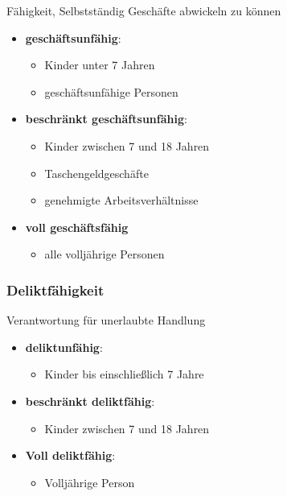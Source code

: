 Fähigkeit, Selbstständig Geschäfte abwickeln zu können

\begin{itemize}
	\item \textbf{geschäftsunfähig}: 
	\begin{itemize}
		\item Kinder unter 7 Jahren 
		\item geschäftsunfähige Personen
	\end{itemize}
	\item \textbf{beschränkt geschäftsunfähig}:
	\begin{itemize}
		\item Kinder zwischen 7 und 18 Jahren
		\item Taschengeldgeschäfte
		\item genehmigte Arbeitsverhältnisse
	\end{itemize}
	\item\textbf{voll geschäftsfähig}
	\begin{itemize}
		\item alle volljährige Personen
	\end{itemize}
\end{itemize}
    
\subsubsection{Deliktfähigkeit}

Verantwortung für unerlaubte Handlung

\begin{itemize}
    \item \textbf{deliktunfähig}:
    	\begin{itemize}
    		\item Kinder bis einschließlich 7 Jahre
    	\end{itemize}
    \item\textbf{beschränkt deliktfähig}:
    	\begin{itemize}
    		\item Kinder zwischen 7 und 18 Jahren
    	\end{itemize}
    \item\textbf{Voll deliktfähig}:
    	\begin{itemize}
    		\item Volljährige Person
    	\end{itemize}
\end{itemize}    		

